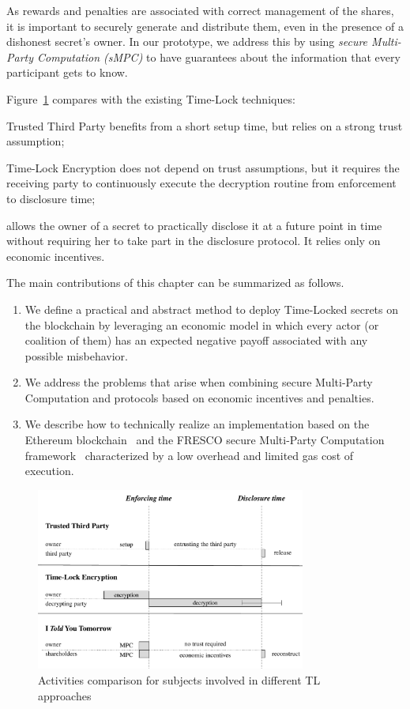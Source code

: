 As rewards and penalties are associated with correct management of the shares, it is important to securely generate and distribute them, even in the presence of a dishonest secret's owner.
In our prototype, we address this by using {\em secure Multi-Party Computation (sMPC)} to have guarantees about the information that every participant gets to know.

Figure~\ref{fig:models} compares \shortname with the existing Time-Lock techniques:

\begin{compactitem}
	\item Trusted Third Party benefits from a short setup time,
          but relies on a strong trust assumption;
	
	\item Time-Lock Encryption does not depend on trust assumptions, but it requires the receiving party to continuously execute the decryption routine from enforcement to disclosure time;
	
	\item {\em \name} allows the owner of a secret to practically disclose it at a future point in time without requiring her to take part in the disclosure protocol. It relies only on economic incentives.
\end{compactitem}

The main contributions of this chapter can be summarized as follows.

\begin{enumerate}

	\smallskip
 	\item We define a practical and abstract method to deploy Time-Locked secrets on the blockchain by leveraging an economic model in which every actor (or coalition of them) has an expected negative payoff associated with any possible misbehavior.
 	
 	\smallskip
 	\item We address the problems that arise when combining secure Multi-Party Computation and protocols based on economic incentives and penalties. 
  
  	\smallskip
 	\item We describe how to technically realize an implementation based on the Ethereum blockchain~\cite{wood2014ethereum} and the FRESCO secure Multi-Party Computation framework~\cite{damgaard2016mpc} characterized by a low overhead and limited gas cost of execution.

\end{enumerate}

\begin{figure}[t]
	\centering
	\includegraphics[height=170pt]{fig/models}
	\caption{Activities comparison for subjects involved in different TL approaches}
	\label{fig:models}
\end{figure}



